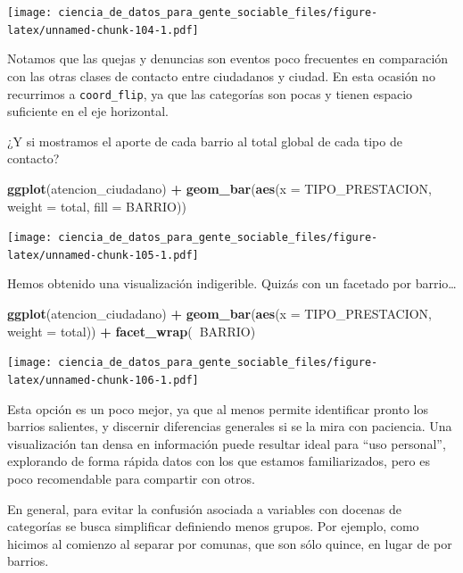 \documentclass[spanish,]{book}
\newenvironment{Shaded}{\begin{snugshade}}{\end{snugshade}}
\newcommand{\DataTypeTok}[1]{\textcolor[rgb]{0.13,0.29,0.53}{#1}}
\newcommand{\KeywordTok}[1]{\textcolor[rgb]{0.13,0.29,0.53}{\textbf{#1}}}
\newcommand{\NormalTok}[1]{#1}
\newcommand{\OperatorTok}[1]{\textcolor[rgb]{0.81,0.36,0.00}{\textbf{#1}}}
\newcommand{\StringTok}[1]{\textcolor[rgb]{0.31,0.60,0.02}{#1}}
\begin{document}
\texttt{[image: ciencia\_de\_datos\_para\_gente\_sociable\_files/figure-latex/unnamed-chunk-104-1.pdf]}

Notamos que las quejas y denuncias son eventos poco frecuentes en comparación con las otras clases de contacto entre ciudadanos y ciudad. En esta ocasión no recurrimos a \texttt{coord\_flip}, ya que las categorías son pocas y tienen espacio suficiente en el eje horizontal.

¿Y si mostramos el aporte de cada barrio al total global de cada tipo de contacto?

\begin{Shaded}
\begin{Highlighting}[]
\KeywordTok{ggplot}\NormalTok{(atencion_ciudadano) }\OperatorTok{+}
\StringTok{    }\KeywordTok{geom_bar}\NormalTok{(}\KeywordTok{aes}\NormalTok{(}\DataTypeTok{x =}\NormalTok{ TIPO_PRESTACION, }\DataTypeTok{weight =}\NormalTok{ total, }\DataTypeTok{fill =}\NormalTok{ BARRIO)) }
\end{Highlighting}
\end{Shaded}

\texttt{[image: ciencia\_de\_datos\_para\_gente\_sociable\_files/figure-latex/unnamed-chunk-105-1.pdf]}

Hemos obtenido una visualización indigerible. Quizás con un facetado por barrio\ldots{}

\begin{Shaded}
\begin{Highlighting}[]
\KeywordTok{ggplot}\NormalTok{(atencion_ciudadano) }\OperatorTok{+}
\StringTok{    }\KeywordTok{geom_bar}\NormalTok{(}\KeywordTok{aes}\NormalTok{(}\DataTypeTok{x =}\NormalTok{ TIPO_PRESTACION, }\DataTypeTok{weight =}\NormalTok{ total)) }\OperatorTok{+}
\StringTok{    }\KeywordTok{facet_wrap}\NormalTok{(}\OperatorTok{~}\NormalTok{BARRIO)}
\end{Highlighting}
\end{Shaded}

\texttt{[image: ciencia\_de\_datos\_para\_gente\_sociable\_files/figure-latex/unnamed-chunk-106-1.pdf]}

Esta opción es un poco mejor, ya que al menos permite identificar pronto los barrios salientes, y discernir diferencias generales si se la mira con paciencia. Una visualización tan densa en información puede resultar ideal para ``uso personal'', explorando de forma rápida datos con los que estamos familiarizados, pero es poco recomendable para compartir con otros.

En general, para evitar la confusión asociada a variables con docenas de categorías se busca simplificar definiendo menos grupos. Por ejemplo, como hicimos al comienzo al separar por comunas, que son sólo quince, en lugar de por barrios.
\end{document}
